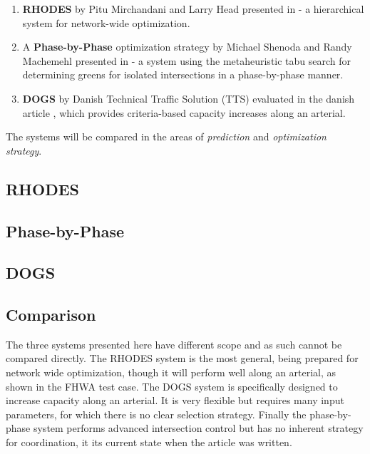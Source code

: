 \begin{enumerate}
\item \textbf{RHODES} by Pitu Mirchandani and Larry Head presented in
\cite{44} - a hierarchical system for network-wide optimization.

\item A \textbf{Phase-by-Phase} optimization strategy by Michael
Shenoda and Randy Machemehl presented in \cite{1} - a system using the
metaheuristic tabu search for determining greens for isolated
intersections in a phase-by-phase manner.

\item \textbf{DOGS} by Danish Technical Traffic Solution (TTS)
evaluated in the danish article \cite{dogs}, which provides
criteria-based capacity increases along an arterial.

\end{enumerate}

The systems will be compared in the areas of \textit{prediction} and
\textit{optimization strategy}.

\subsection{RHODES}


\subsection{Phase-by-Phase}


\subsection{DOGS}


\subsection{Comparison}

The three systems presented here have different scope and as such
cannot be compared directly. The RHODES system is the most general,
being prepared for network wide optimization, though it will perform
well along an arterial, as shown in the FHWA test case. The DOGS
system is specifically designed to increase capacity along an
arterial. It is very flexible but requires many input parameters, for
which there is no clear selection strategy. Finally the phase-by-phase
system performs advanced intersection control but has no inherent
strategy for coordination, it its current state when the article was
written.

